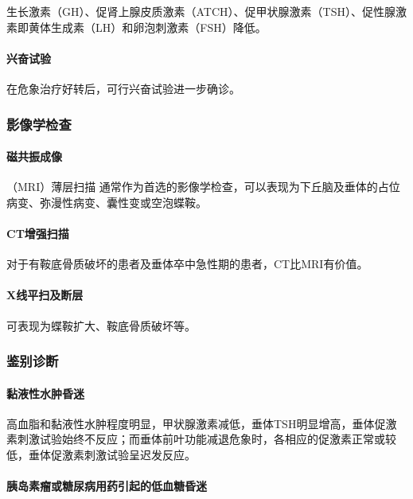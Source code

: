 生长激素（GH）、促肾上腺皮质激素（ATCH）、促甲状腺激素（TSH）、促性腺激素即黄体生成素（LH）和卵泡刺激素（FSH）降低。

\paragraph{兴奋试验}

在危象治疗好转后，可行兴奋试验进一步确诊。

\subsubsection{影像学检查}

\paragraph{磁共振成像}

（MRI）薄层扫描
通常作为首选的影像学检查，可以表现为下丘脑及垂体的占位病变、弥漫性病变、囊性变或空泡蝶鞍。

\paragraph{CT增强扫描}

对于有鞍底骨质破坏的患者及垂体卒中急性期的患者，CT比MRI有价值。

\paragraph{X线平扫及断层}

可表现为蝶鞍扩大、鞍底骨质破坏等。

\subsubsection{鉴别诊断}

\paragraph{黏液性水肿昏迷}

高血脂和黏液性水肿程度明显，甲状腺激素减低，垂体TSH明显增高，垂体促激素刺激试验始终不反应；而垂体前叶功能减退危象时，各相应的促激素正常或较低，垂体促激素刺激试验呈迟发反应。

\paragraph{胰岛素瘤或糖尿病用药引起的低血糖昏迷}

